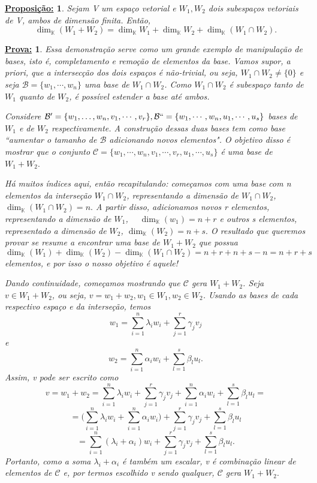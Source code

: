\documentclass{article}
\newtheorem*{proposition*}{\underline{Proposi\c c\~ao:}}
\newtheorem*{proof*}{\underline{Prova:}}
\begin{document}
\begin{proposition*}
	Sejam V um espa\c co vetorial e $W_1, W_2$ dois subespa\c cos vetoriais de V, ambos de dimens\~ao finita. Ent\~ao,
	$$
		\dim_{\mathbb{K}} (W_1 + W_2) = \dim_{\mathbb{K}} W_1 + \dim_{\mathbb{K}} W_2 + \dim_{\mathbb{K}}(W_1\cap W_2).
	$$
\end{proposition*}
\begin{proof*}
	Essa demonstra\c c\~ao serve como um grande exemplo de manipula\c c\~ao de bases, isto \'e, completamento e remo\c c\~ao
	de elementos da base. Vamos supor, a priori, que a intersec\c c\~ao dos dois espa\c cos \'e n\~ao-trivial, ou seja,
	$W_1\cap{W_2} \neq \{0\}$ e seja $\mathcal{B} = \{w_1, \cdots, w_n\}$ uma base de $W_1\cap{W_2}$. Como $W_1\cap{W_2}$
	\'e subespa\c co tanto de $W_1$ quanto de $W_2$, \'e poss\'ivel estender a base at\'e ambos.

	Considere $\mathcal{B'} = \{w_1, \dots, w_n, v_1, \cdots, v_r\}, \mathcal{B``} = \{w_1, \cdots, w_n, u_1, \cdots, u_s\}$
	bases de $W_1$ e de $W_2$ respectivamente. A constru\c c\~ao dessas duas bases tem como base ``aumentar o tamanho de
	$\mathcal{B}$ adicionando novos elementos". O objetivo disso \'e mostrar que o conjunto $\mathcal{C} = \{w_1, \cdots,
		w_n, v_1, \cdots, v_r, u_1, \cdots, u_s\}$ \'e uma base de $W_1 + W_2.$

	H\'a muitos \'indices aqui, ent\~ao recapitulando: come\c camos com uma base com n elementos da interse\c c\~ao $W_1\cap{W_2}$,
	representando a dimens\~ao de $W_1\cap{W_2}$, $\dim_{\mathbb{K}}(W_1\cap{W_2}) = n.$ A partir disso, adicionamos novos r
	elementos, representando a dimens\~ao de $W_1$, $\quad\dim_{\mathbb{K}}(w_1) = n + r$ e outros s elementos, representado
	a dimens\~ao de $W_2$, $\dim_{\mathbb{K}}(W_2) = n + s.$ O resultado que queremos provar se resume a encontrar uma base de
	$W_1 + W_2$ que possua
	$$
		\dim_{\mathbb{K}}(W_1) + \dim_{\mathbb{K}}(W_2) - \dim_{\mathbb{K}}(W_1\cap{W_2}) = n + r + n + s - n = n + r + s
	$$
	elementos, e por isso o nosso objetivo \'e aquele!

	Dando continuidade, come\c camos mostrando que $\mathcal{C}$ gera $W_1 + W_2$. Seja $v\in{W_1+W_2}$, ou seja,
	$v = w_1 + w_2, w_1\in{W_1}, w_2\in{W_2}$. Usando as bases de cada respectivo espa\c co e da interse\c c\~ao, temos
	$$
		w_1 = \sum_{i=1}^{n}\lambda_{i}w_{i} + \sum_{j=1}^{r}\gamma_{j}v_{j}
	$$
	e
	$$
		w_2 = \sum_{i=1}^{n}\alpha_{i}w_{i} + \sum_{l=1}^{s}\beta_{l}u_{l}.
	$$
	Assim, v pode ser escrito como
	$$
		v = w_1 + w_2 = \sum_{i=1}^{n}\lambda_{i}w_{i} + \sum_{j=1}^{r}\gamma_{j}v_{j} +
		\sum_{i=1}^{n}\alpha_{i}w_{i} + \sum_{l=1}^{s}\beta_{l}u_{l} =
	$$
	$$
		= \biggl(\sum_{i=1}^{n}\lambda_{i}w_{i} + \sum_{i=1}^{n}\alpha_{i}w_{i}\biggr) + \sum_{j=1}^{r}\gamma_{j}v_{j} + \sum_{l=1}^{s}\beta_{l}u_{l}
	$$
	$$
		= \sum_{i=1}^{n}(\lambda_{i} + \alpha_{i})w_{i} + \sum_{j=1}^{r}\gamma_{j}v_{j} + \sum_{l=1}^{s}\beta_{l}u_{l}.
	$$
	Portanto, como a soma $\lambda_{i} + \alpha_{i}$ \'e tamb\'em um escalar, v \'e combina\c c\~ao linear de elementos de $\mathcal{C}$ e,
	por termos escolhido v sendo qualquer, $\mathcal{C}$ gera $W_1 + W_2.$


\end{proof*}
\end{document}
